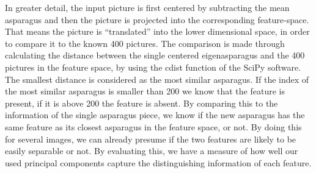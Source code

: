 In greater detail, the input picture is first centered by subtracting the mean asparagus and then the picture is projected into the corresponding feature-space. That means the picture is “translated” into the lower dimensional space, in order to compare it to the known 400 pictures. The comparison is made through calculating the distance between the single centered eigenasparagus and the 400 pictures in the feature space, by using the cdist function of the SciPy software. The smallest distance is considered as the most similar asparagus. If the index of the most similar asparagus is smaller than 200 we know that the feature is present, if it is above 200 the feature is absent. By comparing this to the information of the single asparagus piece, we know if the new asparagus has the same feature as its closest asparagus in the feature space, or not. By doing this for several images, we can already presume if the two features are likely to be easily separable or not. By evaluating this, we have a measure of how well our used principal components capture the distinguishing information of each feature.\\

